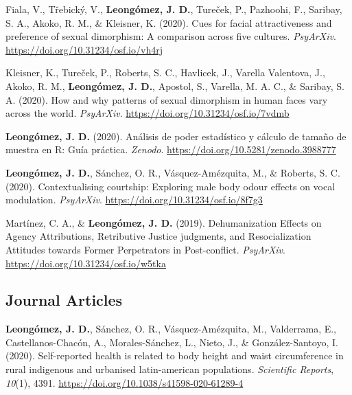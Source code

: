 \documentclass[11pt, a4paper]{awesome-cv}
\begin{document}
\leavevmode\hypertarget{ref-Fiala2020}{}%
Fiala, V., Třebický, V., \textbf{Leongómez, J. D.}, Tureček, P., Pazhoohi, F., Saribay, S. A., Akoko, R. M., \& Kleisner, K. (2020). Cues for facial attractiveness and preference of sexual dimorphism: A comparison across five cultures. \emph{PsyArXiv}. \url{https://doi.org/10.31234/osf.io/vh4rj}

\leavevmode\hypertarget{ref-Kleisner2020}{}%
Kleisner, K., Tureček, P., Roberts, S. C., Havlicek, J., Varella Valentova, J., Akoko, R. M., \textbf{Leongómez, J. D.}, Apostol, S., Varella, M. A. C., \& Saribay, S. A. (2020). How and why patterns of sexual dimorphism in human faces vary across the world. \emph{PsyArXiv}. \url{https://doi.org/10.31234/osf.io/7vdmb}

\leavevmode\hypertarget{ref-Leongomez2020a}{}%
\textbf{Leongómez, J. D.} (2020). Análisis de poder estadístico y cálculo de tamaño de muestra en R: Guía práctica. \emph{Zenodo}. \url{https://doi.org/10.5281/zenodo.3988777}

\leavevmode\hypertarget{ref-Leongomez2020}{}%
\textbf{Leongómez, J. D.}, Sánchez, O. R., Vásquez-Amézquita, M., \& Roberts, S. C. (2020). Contextualising courtship: Exploring male body odour effects on vocal modulation. \emph{PsyArXiv}. \url{https://doi.org/10.31234/osf.io/8f7g3}

\leavevmode\hypertarget{ref-Martinez2019}{}%
Martínez, C. A., \& \textbf{Leongómez, J. D.} (2019). Dehumanization Effects on Agency Attributions, Retributive Justice judgments, and Resocialization Attitudes towards Former Perpetrators in Post-conflict. \emph{PsyArXiv}. \url{https://doi.org/10.31234/osf.io/w5tka}

\endgroup

\hypertarget{journal-articles}{%
\subsection{Journal Articles}\label{journal-articles}}

\begingroup
\setlength{\parindent}{-0.5in}
\setlength{\leftskip}{0.5in}

\hypertarget{refs_journals}{}
\leavevmode\hypertarget{ref-Leonguxf3mez2020}{}%
\textbf{Leongómez, J. D.}, Sánchez, O. R., Vásquez-Amézquita, M., Valderrama, E., Castellanos-Chacón, A., Morales-Sánchez, L., Nieto, J., \& González-Santoyo, I. (2020). Self-reported health is related to body height and waist circumference in rural indigenous and urbanised latin-american populations. \emph{Scientific Reports}, \emph{10}(1), 4391. \url{https://doi.org/10.1038/s41598-020-61289-4}
\end{document}
